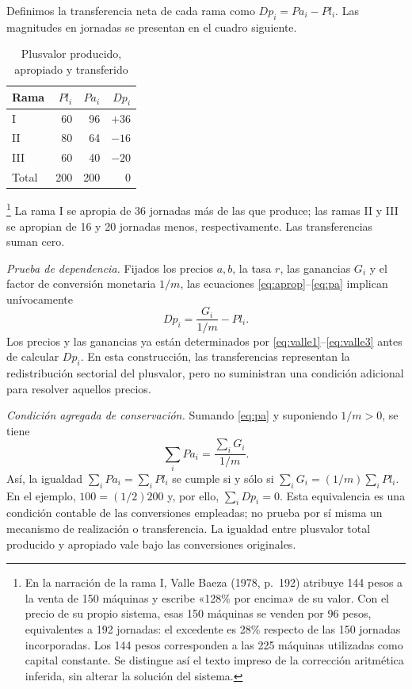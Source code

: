 \documentclass[10pt,twoside]{article}
\begin{document}
Definimos la transferencia neta de cada rama como $Dp_i=Pa_i-Pl_i$. Las magnitudes en jornadas se presentan en el cuadro siguiente.
\begin{table}[H]\centering\footnotesize
\caption{Plusvalor producido, apropiado y transferido}
\begin{tabular}{@{}lrrr@{}}\toprule
Rama & $Pl_i$ & $Pa_i$ & $Dp_i$\\\midrule
I & 60 & 96 & $+36$\\
II & 80 & 64 & $-16$\\
III & 60 & 40 & $-20$\\\midrule
Total & 200 & 200 & $0$\\\bottomrule
\end{tabular}
\end{table}
\footnote{En la narración de la rama I, Valle Baeza (1978, p.~192) atribuye 144 pesos a la venta de 150 máquinas y escribe «128\% por encima» de su valor. Con el precio de su propio sistema, esas 150 máquinas se venden por 96 pesos, equivalentes a 192 jornadas: el excedente es 28\% respecto de las 150 jornadas incorporadas. Los 144 pesos corresponden a las 225 máquinas utilizadas como capital constante. Se distingue así el texto impreso de la corrección aritmética inferida, sin alterar la solución del sistema.} La rama I se apropia de 36 jornadas más de las que produce; las ramas II y III se apropian de 16 y 20 jornadas menos, respectivamente. Las transferencias suman cero. 

\noindent\textit{Prueba de dependencia.} Fijados los precios $a,b$, la tasa $r$, las ganancias $G_i$ y el factor de conversión monetaria $1/m$, las ecuaciones \eqref{eq:aprop}--\eqref{eq:pa} implican unívocamente
\[
Dp_i=\frac{G_i}{1/m}-Pl_i.
\]
Los precios y las ganancias ya están determinados por \eqref{eq:valle1}--\eqref{eq:valle3} antes de calcular $Dp_i$. En esta construcción, las transferencias representan la redistribución sectorial del plusvalor, pero no suministran una condición adicional para resolver aquellos precios.

\noindent\textit{Condición agregada de conservación.} Sumando \eqref{eq:pa} y suponiendo $1/m>0$, se tiene
\[
\sum_i Pa_i=\frac{\sum_i G_i}{1/m}.
\]
Así, la igualdad $\sum_i Pa_i=\sum_i Pl_i$ se cumple si y sólo si $\sum_i G_i=(1/m)\sum_i Pl_i$. En el ejemplo, $100=(1/2)200$ y, por ello, $\sum_i Dp_i=0$. Esta equivalencia es una condición contable de las conversiones empleadas; no prueba por sí misma un mecanismo de realización o transferencia. La igualdad entre plusvalor total producido y apropiado vale bajo las conversiones originales.
\end{document}
